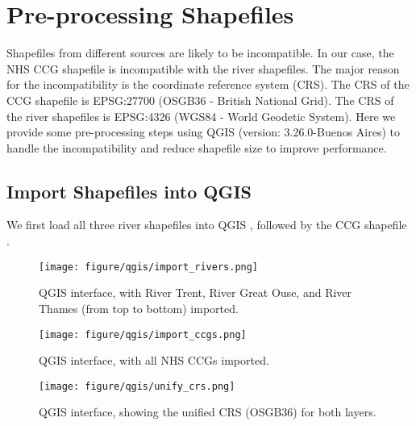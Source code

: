 \appendix

\let\origappendixsection=\section
\renewcommand\section[1]{\origappendixsection{\textbf{#1}}}
\section{Pre-processing Shapefiles}
\label{app:pre-processing}
Shapefiles from different sources are likely to be incompatible. In our case, the NHS CCG shapefile is incompatible with the river shapefiles. The major reason for the incompatibility is the coordinate reference system (CRS). The CRS of the CCG shapefile is EPSG:27700 (OSGB36 - British National Grid). The CRS of the river shapefiles is EPSG:4326 (WGS84 - World Geodetic System). Here we provide some pre-processing steps using QGIS (version: 3.26.0-Buenos Aires) \cite{qgisWelcome} to handle the incompatibility and reduce shapefile size to improve performance.

\subsection{Import Shapefiles into QGIS}
We first load all three river shapefiles into QGIS , followed by the CCG shapefile .

{
\begin{figure}[h!]
    \centering
    \texttt{[image: figure/qgis/import\_rivers.png]}
    \caption{QGIS interface, with River Trent, River Great Ouse, and River Thames (from top to bottom) imported.}
    \label{fig:import_rivers}
\end{figure}

\begin{figure}[h!]
    \centering
    \texttt{[image: figure/qgis/import\_ccgs.png]}
    \caption{QGIS interface, with all NHS CCGs imported.}
    \label{fig:import_ccgs}
\end{figure}

\begin{figure}[h!]
    \centering
    \texttt{[image: figure/qgis/unify\_crs.png]}
    \caption{QGIS interface, showing the unified CRS (OSGB36) for both layers.}
    \label{fig:unify_crs}
\end{figure}
}

